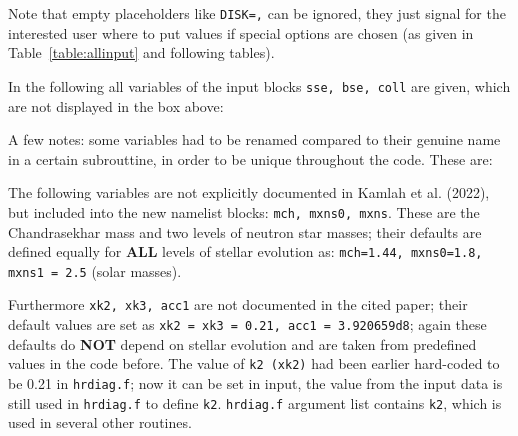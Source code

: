 Note that empty placeholders like {\tt DISK=,} can be ignored, they just signal for the interested user where to put values if special options are chosen (as given in Table~\ref{table:allinput} and following tables).
\newpage

In the following all variables of the input blocks {\tt sse, bse, coll} are given, which are not displayed in the box above:

\begin{center}
\end{center}

A few notes: some variables had to be renamed compared to their genuine name in a certain subrouttine, in order to be unique throughout the code. These are:

\begin{center}
\end{center}

The following variables are not explicitly documented in Kamlah et al. (2022), but included into the new namelist blocks: {\tt mch, mxns0, mxns}. These are the Chandrasekhar mass and two levels of neutron star masses; their defaults are defined equally for {\bf ALL} levels of stellar evolution as: {\tt mch=1.44, mxns0=1.8, mxns1 = 2.5} (solar masses).

Furthermore {\tt xk2, xk3, acc1} are not documented in the cited paper; their default values are set as {\tt xk2 = xk3 = 0.21, acc1 = 3.920659d8}; again these defaults do {\bf NOT} depend on stellar evolution and are taken from predefined values in the code before.
The value of {\tt k2 (xk2)} had been earlier hard-coded to be 0.21 in {\tt hrdiag.f}; now it can be set in input, the value from the input data is still used in {\tt hrdiag.f} to define {\tt k2}. {\tt hrdiag.f} argument list contains {\tt k2}, which is used in several other routines. 

